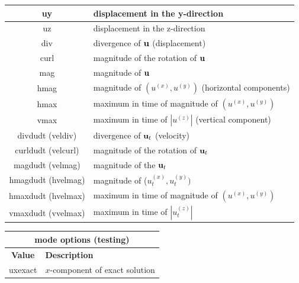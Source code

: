 \documentclass[11pt]{report}
\newcommand{\ub}{{\bf u}}
\begin{document}
{\begin{center}
\begin{tabular}{|c|l|}
		uy                 & displacement in the y-direction                           \\ \hline
		uz                 & displacement in the z-direction                           \\ \hline\hline
		div                & divergence of $\ub$ (displacement)                        \\ \hline
		curl               & magnitude of the rotation of $\ub$                        \\ \hline
		mag                & magnitude of $\ub$                                        \\ \hline
		hmag               & magnitude of $(u^{(x)}, u^{(y)})$ (horizontal components) \\ \hline
		hmax               & maximum in time of magnitude of $(u^{(x)}, u^{(y)})$      \\ \hline
		vmax               & maximum in time of $|u^{(z)}|$ (vertical component)       \\ \hline\hline
		divdudt (veldiv)   & divergence of $\ub_t$ (velocity)                          \\ \hline
		curldudt (velcurl) & magnitude of the rotation of $\ub_t$                      \\ \hline
		magdudt (velmag)   & magnitude of the $\ub_t$                                  \\ \hline
		hmagdudt (hvelmag) & magnitude of ($u^{(x)}_t, u^{(y)}_t)$                     \\ \hline
		hmaxdudt (hvelmax) & maximum in time of magnitude of $(u^{(x)}, u^{(y)})$      \\ \hline
		vmaxdudt (vvelmax) & maximum in time of $|u^{(z)}_t|$                          \\ \hline
	\end{tabular}
\end{center}
\begin{center}
	\begin{tabular}{|c|l|} \hline
		\multicolumn{2}{|c|}{\bf mode options (testing)}                                     \\ \hline
		\bf{Value} & \bf{Description}                                                        \\
		\hline  \hline
		uxexact    & $x$-component of exact solution                                         \\ \hline

\end{tabular}
\end{center}}
\end{document}
